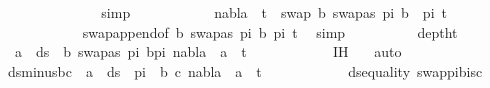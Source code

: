 \begin{isabellebody}
\ \ \ \ \ \ \ \ \ \ \isamarkupfalse%
\ {}{\isacharparenleft}{\kern0pt}{}{\isacharcomma}{\kern0pt}{}{\isacharparenright}{\kern0pt}\ \isamarkupfalse%
\ simp\isanewline
\ \ \ \ \ \ \ \ \isamarkupfalse%
\ \isamarkupfalse%
\ {\isachardoublequoteopen}nabla\ {\isasymturnstile}\ t{}\ {\isasymapprox}\ swap\ {\isacharparenleft}{\kern0pt}{\isacharbrackleft}{\kern0pt}{\isacharparenleft}{\kern0pt}b{\isacharcomma}{\kern0pt}\ swapas\ pi\ b{\isacharparenright}{\kern0pt}{\isacharbrackright}{\kern0pt}\ {\isacharat}{\kern0pt}\ pi{\isacharparenright}{\kern0pt}\ t{}{\isachardoublequoteclose}\isanewline
\ \ \ \ \ \ \ \ \ \ \isamarkupfalse%
\ swap{\isacharunderscore}{\kern0pt}append{\isacharbrackleft}{\kern0pt}of\ {\isacartoucheopen}{\isacharbrackleft}{\kern0pt}{\isacharparenleft}{\kern0pt}b{\isacharcomma}{\kern0pt}\ swapas\ pi\ b{\isacharparenright}{\kern0pt}{\isacharbrackright}{\kern0pt}{\isacartoucheclose}\ pi\ t{}{\isacharbrackright}{\kern0pt}\ \isamarkupfalse%
\ simp\isanewline
\ \ \ \ \ \ \ \ \isamarkupfalse%
\ deptht{}\ \isamarkupfalse%
\ {\isachardoublequoteopen}{\isasymforall}\ a\ {\isasymin}\ ds\ {\isacharbrackleft}{\kern0pt}{\isacharbrackright}{\kern0pt}\ {\isacharparenleft}{\kern0pt}{\isacharparenleft}{\kern0pt}b{\isacharcomma}{\kern0pt}\ swapas\ pi\ b{\isacharparenright}{\kern0pt}{\isacharhash}{\kern0pt}pi{\isacharparenright}{\kern0pt}{\isachardot}{\kern0pt}\ nabla\ {\isasymturnstile}\ a\ {\isasymsharp}\ t{}{\isachardoublequoteclose}\isanewline
\ \ \ \ \ \ \ \ \ \ \isamarkupfalse%
\ {\isachardoublequoteopen}{}{\isachardot}{\kern0pt}IH{\isachardoublequoteclose}\ {}\ \isamarkupfalse%
\ auto\isanewline
\ \ \ \ \ \ \ \ \isamarkupfalse%
\ \isamarkupfalse%
\ ds{\isacharunderscore}{\kern0pt}minus{\isacharunderscore}{\kern0pt}bc{\isacharcolon}{\kern0pt}\ {\isachardoublequoteopen}{\isasymforall}\ a\ {\isasymin}\ ds\ {\isacharbrackleft}{\kern0pt}{\isacharbrackright}{\kern0pt}\ pi\ {\isacharminus}{\kern0pt}\ {\isacharbraceleft}{\kern0pt}b{\isacharcomma}{\kern0pt}\ c{\isacharbraceright}{\kern0pt}{\isachardot}{\kern0pt}\ nabla\ {\isasymturnstile}\ a\ {\isasymsharp}\ t{}{\isachardoublequoteclose}\isanewline
\ \ \ \ \ \ \ \ \ \ \isamarkupfalse%
\ ds{\isacharunderscore}{\kern0pt}equality\ swap{\isacharunderscore}{\kern0pt}pi{\isacharunderscore}{\kern0pt}b{\isacharunderscore}{\kern0pt}is{\isacharunderscore}{\kern0pt}c\ \isamarkupfalse%

\end{isabellebody}
